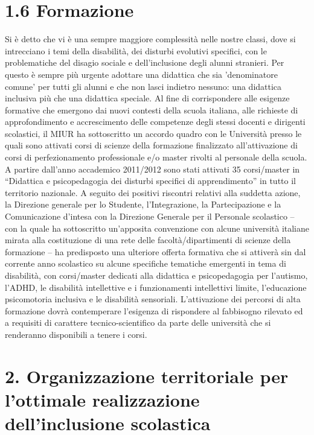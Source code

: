 \section*{1.6 Formazione}
Si è detto che vi è una sempre maggiore complessità nelle nostre classi, dove si intrecciano i temi della
disabilità, dei disturbi evolutivi specifici, con le problematiche del disagio sociale e dell'inclusione degli
alunni stranieri. Per questo è sempre più urgente adottare una didattica che sia 'denominatore comune' per
tutti gli alunni e che non lasci indietro nessuno: una didattica inclusiva più che una didattica speciale.
Al fine di corrispondere alle esigenze formative che emergono dai nuovi contesti della scuola italiana, alle
richieste di approfondimento e accrescimento delle competenze degli stessi docenti e dirigenti scolastici, il
MIUR ha sottoscritto un accordo quadro con le Università presso le quali sono attivati corsi di scienze della
formazione finalizzato all'attivazione di corsi di perfezionamento professionale e/o master rivolti al
personale della scuola.
A partire dall'anno accademico 2011/2012 sono stati attivati 35 corsi/master in “Didattica e psicopedagogia
dei disturbi specifici di apprendimento” in tutto il territorio nazionale.
A seguito dei positivi riscontri relativi alla suddetta azione, la Direzione generale per lo Studente,
l'Integrazione, la Partecipazione e la Comunicazione d'intesa con la Direzione Generale per il Personale
scolastico – con la quale ha sottoscritto un'apposita convenzione con alcune università italiane mirata alla
costituzione di una rete delle facoltà/dipartimenti di scienze della formazione – ha predisposto una ulteriore
offerta formativa che si attiverà sin dal corrente anno scolastico su alcune specifiche tematiche emergenti in
tema di disabilità, con corsi/master dedicati alla didattica e psicopedagogia per l'autismo, l'ADHD, le
disabilità intellettive e i funzionamenti intellettivi limite, l'educazione psicomotoria inclusiva e le disabilità
sensoriali.
L'attivazione dei percorsi di alta formazione dovrà contemperare l'esigenza di rispondere al fabbisogno
rilevato ed a requisiti di carattere tecnico-scientifico da parte delle università che si renderanno disponibili a
tenere i corsi.
\section*{2. Organizzazione territoriale per l'ottimale realizzazione dell'inclusione scolastica}
